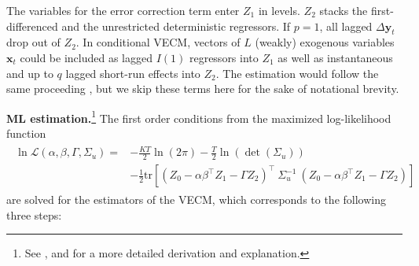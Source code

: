 The variables for the error correction term enter $ Z_1 $ in levels. $ Z_2 $ stacks the first-differenced and the unrestricted deterministic regressors. If $ p=1 $, all lagged $ \Delta \boldsymbol{y}_{t} $ drop out of $ Z_2 $. In conditional VECM, vectors of $ L $ (weakly) exogenous variables $ \boldsymbol{x}_t $ could be included as lagged $I(1)$ regressors into $ Z_1 $ as well as instantaneous and up to $ q $ lagged short-run effects into $ Z_2 $. The estimation would follow the same proceeding \citep[p.~398]{PesaranEtAl2000,Lutkepohl2005}, but we skip these terms here for the sake of notational brevity.


\textbf{ML estimation.}\footnote{See \citet[Ch.~6]{Johansen1996}, \citet[Ch.~7.2.3]{Lutkepohl2005} and \citet[Ch.~3.1]{Lutkepohl2006} for a more detailed derivation and explanation.} The first order conditions from the maximized log-likelihood function
\begin{align} \label{eq:vecmLikeli}
\begin{split}
	\ln \mathcal{L} \left(\alpha, \beta, \Gamma, \Sigma_u \right) = & - \frac{KT}{2} \ln \left( 2\pi \right) - \frac{T}{2} \ln \left( \det ( \Sigma_u ) \right) \\
	& - \frac{1}{2} \text{tr} \left[ \left( Z_{0} - \alpha\beta^\top Z_{1} - \Gamma Z_{2} \right)^\top \ \Sigma_u^{-1} \ \left( Z_{0} - \alpha\beta^\top Z_{1} - \Gamma Z_{2} \right) \right]
\end{split}
\end{align} 
are solved for the estimators of the VECM, which corresponds to the following three steps:
